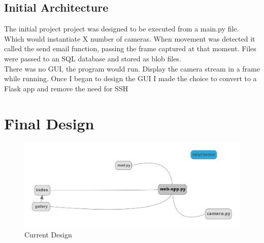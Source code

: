     \subsection{Initial Architecture}
    The initial project project was designed to be executed from a main.py file. Which would instantiate X number of cameras. When movement was detected it called the send email function, passing the frame captured at that moment. Files were passed to an SQL database and stored as blob files.\\
    There was no GUI, the program would run. Display the camera stream in a frame while running.
    Once I began to design the GUI I made the choice to convert to a Flask app and remove the need for SSH
    \section {Final Design}
    \begin{figure}[!htbp] 
        \centering
        \includegraphics[scale=0.4]{img/currentDesign.png}
        \caption{Current Design}
        \label{fig:my_label}
    \end{figure}    
